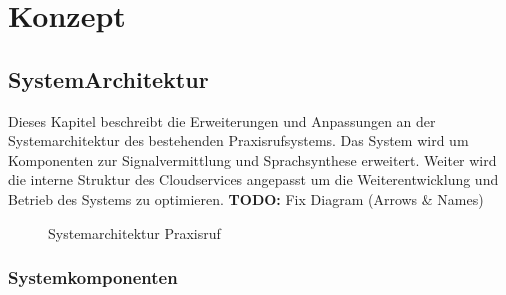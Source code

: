 \section{Konzept}

\subsection{SystemArchitektur}

Dieses Kapitel beschreibt die Erweiterungen und Anpassungen an der Systemarchitektur des bestehenden Praxisrufsystems.
Das System wird um Komponenten zur Signalvermittlung und Sprachsynthese erweitert.
Weiter wird die interne Struktur des Cloudservices angepasst um die Weiterentwicklung und Betrieb des Systems zu optimieren.
\textbf{TODO:} Fix Diagram (Arrows & Names)

\begin{figure}[h]
    \centering
    \begin{minipage}[b]{0.75\textwidth}
        \caption{Systemarchitektur Praxisruf}
    \end{minipage}
\end{figure}

\subsubsection{Systemkomponenten}

